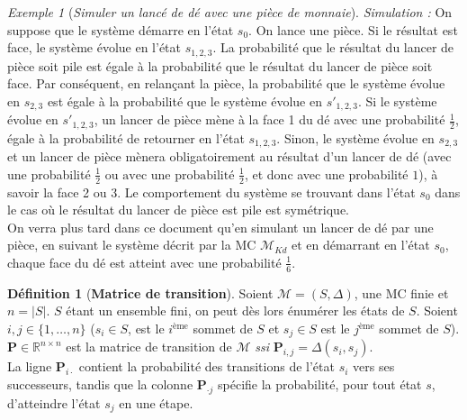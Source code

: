 \documentclass[12pt,a4paper]{report}
\theoremstyle{definition}%
\newtheorem{definition}{Définition}[chapter]
\theoremstyle{remark}
\newtheorem{example}{Exemple}[chapter]
\newcommand{\ssi}{\textit{ssi} }
\begin{document}
\begin{example} [\textit{Simuler un lancé de dé avec une pièce de monnaie}]
	\textit{Simulation : }On suppose que le système démarre en l'état $s_0$. On lance une pièce. Si le résultat est face, le système évolue en l'état $s_{1, 2, 3}$. La probabilité que le résultat du lancer de pièce soit pile est égale à la probabilité que le résultat du lancer de pièce soit face. Par conséquent, en relançant la pièce, la probabilité que le système évolue en $s_{2, 3}$ est égale à la probabilité que le système évolue en $s'_{1, 2, 3}$. Si le système évolue en $s'_{1, 2, 3}$, un lancer de pièce mène à la face 1 du dé avec une probabilité $\frac{1}{2}$, égale à la probabilité de retourner en l'état $s_{1, 2, 3}$. Sinon, le système évolue en $s_{2, 3}$ et un lancer de pièce mènera obligatoirement au résultat d'un lancer de dé (avec une probabilité $\frac{1}{2} \text{ ou avec une probabilité }  \frac{1}{2}$, et donc avec une probabilité $1$), à savoir la face 2 ou 3. Le comportement du système se trouvant dans l'état $s_0$ dans le cas où le résultat du lancer de pièce est pile est symétrique.\\
	
	On verra plus tard dans ce document qu'en simulant un lancer de dé par une pièce, en suivant le système décrit par la MC $\mathcal{M}_{Kd}$ et en démarrant en l'état $s_0$, chaque face du dé est atteint avec une probabilité $\frac{1}{6}$.
\end{example}

\begin{definition}[\textbf{Matrice de transition}]
	Soient $\mathcal{M} = (S, \Delta)$, une MC finie et $n = |S|$. $S$ étant un ensemble fini, on peut dès lors énumérer les états de $S$. Soient $i,j \in \{1, \dots, n\}$ ($s_i \in S$, est le $i^{\text{ème}}$ sommet de $S$ et $s_j \in S$ est le $j^{\text{ème}}$ sommet de $S$).
	\textbf{P}$\in \mathbb{R}^{n \times n}$ est la matrice de transition de $\mathcal{M}$ \ssi $\textbf{P}_{i,j} = \Delta(s_i, s_j)$.\\
	La ligne $\textbf{P}_{i \cdot}$ contient la probabilité des transitions de l'état $s_i$ vers ses successeurs, tandis que la colonne $\textbf{P}_{\cdot j}$ spécifie la probabilité, pour tout état $s$, d'atteindre l'état $s_j$ en une étape.
\end{definition}
\end{document}
